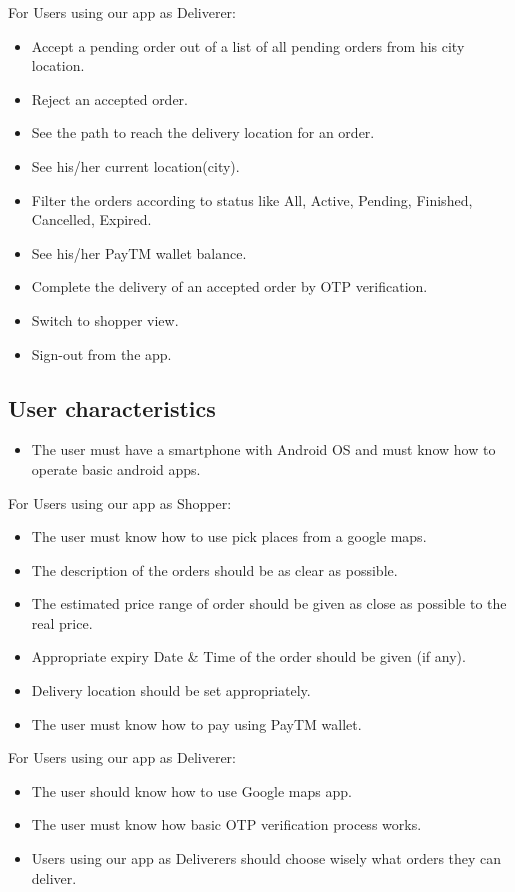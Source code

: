 \documentclass{report}
\begin{document}
For Users using our app as Deliverer:
\begin{itemize}[label=$\diamond$]
\item Accept a pending order out of a list of all pending orders from his city location.
\item Reject an accepted order.
\item See the path to reach the delivery location for an order.
\item See his/her current location(city).
\item Filter the orders according to status like All, Active, Pending, Finished, Cancelled, Expired.
\item See his/her PayTM wallet balance.
\item Complete the delivery of an accepted order by OTP verification. 
\item Switch to shopper view.
\item Sign-out from the app.
\end{itemize}

\subsection{User characteristics}
\begin{itemize}
\item The user must have a smartphone with Android OS and must know how to operate basic android apps.
\end{itemize}

For Users using our app as Shopper:
\begin{itemize}[label=$\diamond$]
\item The user must know how to use pick places from a google maps.
\item The description of the orders should be as clear as possible.
\item The estimated price range of order should be given as close as possible to the real price.
\item Appropriate expiry Date \& Time of the order should be given (if any).
\item Delivery location should be set appropriately. 
\item The user must know how to pay using PayTM wallet.
\end{itemize}

For Users using our app as Deliverer:
\begin{itemize}[label=$\diamond$]
\item The user should know how to use Google maps app.
\item The user must know how basic OTP verification process works.
\item Users using our app as Deliverers should choose wisely what orders they can deliver.
\end{itemize}
\end{document}
